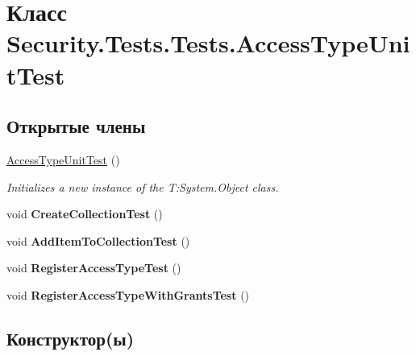 \hypertarget{class_security_1_1_tests_1_1_tests_1_1_access_type_unit_test}{}\section{Класс Security.\+Tests.\+Tests.\+Access\+Type\+Unit\+Test}
\label{class_security_1_1_tests_1_1_tests_1_1_access_type_unit_test}
\subsection*{Открытые члены}
\begin{DoxyCompactItemize}
\item 
\hyperlink{class_security_1_1_tests_1_1_tests_1_1_access_type_unit_test_a6900a8df76b823480ba0d7e2ed8b1c0e}{Access\+Type\+Unit\+Test} ()
\begin{DoxyCompactList}\small\item\em Initializes a new instance of the T\+:\+System.\+Object class. \end{DoxyCompactList}\item 
\mbox{\label{class_security_1_1_tests_1_1_tests_1_1_access_type_unit_test_a9c64bcdb9f70817f2ef6d66f3818287a}} 
void {\bfseries Create\+Collection\+Test} ()
\item 
\mbox{\label{class_security_1_1_tests_1_1_tests_1_1_access_type_unit_test_ae4fbd3dd0396af74b75c2a31f6140a28}} 
void {\bfseries Add\+Item\+To\+Collection\+Test} ()
\item 
\mbox{\label{class_security_1_1_tests_1_1_tests_1_1_access_type_unit_test_a331c449d6cf267bfacabed8446720783}} 
void {\bfseries Register\+Access\+Type\+Test} ()
\item 
\mbox{\label{class_security_1_1_tests_1_1_tests_1_1_access_type_unit_test_af818abfbb37b5595911d503792f5d575}} 
void {\bfseries Register\+Access\+Type\+With\+Grants\+Test} ()
\end{DoxyCompactItemize}


\subsection{Конструктор(ы)}
\mbox{\label{class_security_1_1_tests_1_1_tests_1_1_access_type_unit_test_a6900a8df76b823480ba0d7e2ed8b1c0e}} 
